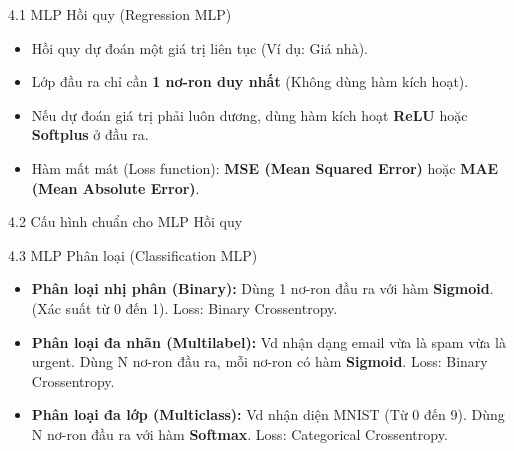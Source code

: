 \documentclass[aspectratio=169, 12pt]{beamer}
\begin{document}
\begin{frame}{4.1 MLP Hồi quy (Regression MLP)}
    \begin{itemize}
        \item Hồi quy dự đoán một giá trị liên tục (Ví dụ: Giá nhà).
        \item Lớp đầu ra chỉ cần \textbf{1 nơ-ron duy nhất} (Không dùng hàm kích hoạt).
        \item Nếu dự đoán giá trị phải luôn dương, dùng hàm kích hoạt \textbf{ReLU} hoặc \textbf{Softplus} ở đầu ra.
        \item Hàm mất mát (Loss function): \textbf{MSE (Mean Squared Error)} hoặc \textbf{MAE (Mean Absolute Error)}.
    \end{itemize}
\end{frame}

\begin{frame}{4.2 Cấu hình chuẩn cho MLP Hồi quy}
    \begin{table}[]
        \centering
        \caption{Hình 10-8: Kiến trúc MLP Hồi quy chuẩn}
    \end{table}
\end{frame}

\begin{frame}{4.3 MLP Phân loại (Classification MLP)}
    \begin{itemize}
        \item \textbf{Phân loại nhị phân (Binary):} Dùng 1 nơ-ron đầu ra với hàm \textbf{Sigmoid}. (Xác suất từ 0 đến 1). Loss: Binary Crossentropy.
        \item \textbf{Phân loại đa nhãn (Multilabel):} Vd nhận dạng email vừa là spam vừa là urgent. Dùng N nơ-ron đầu ra, mỗi nơ-ron có hàm \textbf{Sigmoid}. Loss: Binary Crossentropy.
        \item \textbf{Phân loại đa lớp (Multiclass):} Vd nhận diện MNIST (Từ 0 đến 9). Dùng N nơ-ron đầu ra với hàm \textbf{Softmax}. Loss: Categorical Crossentropy.
    \end{itemize}
\end{frame}
\end{document}

